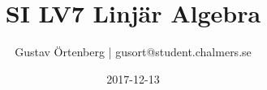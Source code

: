 \documentclass{article}
\title{SI LV7 Linjär Algebra}
\author{Gustav Örtenberg | \small{gusort@student.chalmers.se}}
\date{2017-12-13}
\begin{document}
\maketitle
\section{}


\section{}


\section{}


\section{}


\section{}


\section{}

\end{document}
